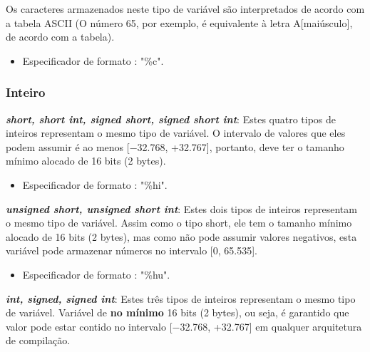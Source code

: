 \documentclass[12pt]{article}
\newcommand\tab[1][1cm]{\hspace*{#1}}
\begin{document}
\hspace{0.25cm}
\begin{tcolorbox}[colback=green!5!white,colframe=green!75!black,title=Curiosidade]
  \par\tab Os caracteres armazenados neste tipo de variável são interpretados de acordo com a tabela ASCII (O número 65, por exemplo, é equivalente à letra A[maiúsculo], de acordo com a tabela)\cite{wiki:extended_ascii_table}.
\end{tcolorbox}

\begin{itemize}
    \item Especificador de formato : "\%c".
\end{itemize}

\subsubsection{Inteiro}

\par\textbf{\textit{short, short int,  signed short, signed short int}}: Estes quatro tipos de inteiros representam o mesmo tipo de variável. O intervalo de valores que eles podem assumir é ao menos [−32.768, +32.767], portanto, deve ter o tamanho mínimo alocado de 16 bits (2 bytes).

\begin{itemize}
    \item Especificador de formato : "\%hi".
\end{itemize}

\hspace{0.2cm}
\par\textbf{\textit{unsigned short, unsigned short int}}: Estes dois tipos de inteiros representam o mesmo tipo de variável. Assim como o tipo short, ele tem o tamanho mínimo alocado de 16 bits (2 bytes), mas como não pode assumir valores negativos, esta variável pode armazenar números no intervalo [0, 65.535].

\begin{itemize}
    \item Especificador de formato : "\%hu".
\end{itemize}

\hspace{0.2cm}
\par\textbf{\textit{int, signed, signed int}}: Estes três tipos de inteiros representam o mesmo tipo de variável. Variável de \textbf{no mínimo} 16 bits (2 bytes), ou seja, é garantido que valor pode estar contido no  intervalo [−32.768, +32.767] em qualquer arquitetura de compilação.
\end{document}
